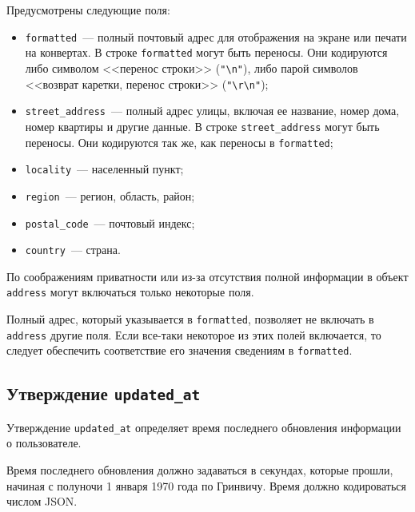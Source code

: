Предусмотрены следующие поля:
\begin{itemize}
\item
\lstinline{formatted}~---
полный почтовый адрес для отображения на экране или печати на конвертах.
%
В строке \lstinline{formatted} могут быть переносы. Они кодируются либо 
символом <<перенос строки>> (\lstinline{"\n"}), либо парой символов
<<возврат каретки, перенос строки>> (\lstinline{"\r\n"});

\item
\lstinline{street_address}~--- полный адрес улицы, включая
ее название, номер дома, номер квартиры и другие данные.
%
В строке \lstinline{street_address} могут быть переносы. Они кодируются так же,
как переносы в \lstinline{formatted};

\item
\lstinline{locality}~--- 
населенный пункт;

\item
\lstinline{region}~--- 
регион, область, район;
%

\item
\lstinline{postal_code}~--- 
почтовый индекс;

\item
\lstinline{country}~--- страна.
\end{itemize}

По соображениям приватности или из-за отсутствия полной информации 
в объект \lstinline{address} могут включаться только некоторые поля.

Полный адрес, который указывается в \lstinline{formatted},
позволяет не включать в \lstinline{address} другие поля.
%
Если все-таки некоторое из этих полей включается, 
то следует обеспечить соответствие его значения сведениям в 
\lstinline{formatted}. 

\subsection{Утверждение \lstinline{updated_at}}\label{CLAIMS.UpdatedAt}

Утверждение \lstinline{updated_at} определяет время последнего обновления 
информации о пользователе. 

Время последнего обновления должно задаваться в секундах, которые прошли, 
начиная с полуночи 1 января 1970 года по Гринвичу. Время должно кодироваться 
числом JSON.  


